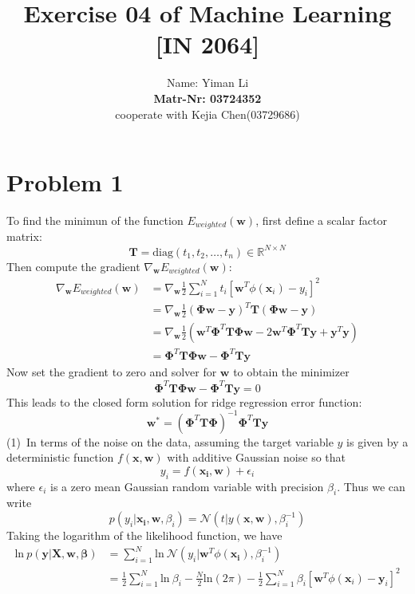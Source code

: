 \documentclass{article}
\title{Exercise 04 of Machine Learning [IN 2064]}
\author{
  Name: Yiman Li \\
  \textbf{Matr-Nr: 03724352} \\
  cooperate with Kejia Chen(03729686)\\
}
\begin{document}
\maketitle

\section*{Problem 1}
To find the minimun of the function $E_{weighted}(\bm{w})$, first define a scalar factor matrix:
\[\bm{T}=\mathrm{diag}(t_1, t_2,\dots, t_n) \in \mathbb{R}^{N\times N} \]
Then compute the gradient $\nabla_{\bm{w}}E_{weighted}(\bm{w})$:
\begin{equation}
	\begin{aligned}
	\nabla_{\bm{w}}E_{weighted}(\bm{w}) 
	&= \nabla_{\bm{w}} \frac{1}{2}\sum_{i=1}^{N}t_i[\bm{w}^T\phi(\bm{x}_i)-y_i]^2\\
	&= \nabla_{\bm{w}} \frac{1}{2}(\bm{\Phi w} - \bm{y})^T \bm{T} (\bm{\Phi w} - \bm{y})\\
	&= \nabla_{\bm{w}} \frac{1}{2}(\bm{w}^T\bm{\Phi}^T\bm{T\Phi w} - 2\bm{w}^T\bm{\Phi}^T\bm{Ty} +\bm{y}^T\bm{y})\\
	&= \bm{\Phi}^T\bm{T\Phi w}-\bm{\Phi}^T\bm{Ty}
	\end{aligned}
\end{equation}
Now set the gradient to zero and solver for $\bm{w}$ to obtain the minimizer
\begin{equation}
\bm{\Phi}^T\bm{T\Phi w}-\bm{\Phi}^T\bm{Ty} = 0
\end{equation}
This leads to the closed form solution for ridge regression error function:
\begin{equation}
\bm{w}^* = (\bm{\Phi}^T\bm{T\Phi})^{-1}\bm{\Phi}^T\bm{Ty}
\end{equation}
(1)\ In terms of the noise on the data, assuming the target variable $y$ is given by a deterministic function $f(\bm{x}, \bm{w})$ with additive Gaussian noise so that
\begin{equation}
y_i = f(\bm{x_i}, \bm{w}) +\epsilon_i
\end{equation}
where $\epsilon_i$ is a zero mean Gaussian random variable with precision $\beta_i$. Thus we can write
\begin{equation}
p(y_i|\bm{x_i}, \bm{w}, \beta_i) = \mathcal{N}(t|y(\bm{x}, \bm{w}), \beta_i^{-1})
\end{equation}
Taking the logarithm of the likelihood function, we have
\begin{equation}
\begin{aligned}
\mathrm{ln}\ p(\bm{y}|\bm{X}, \bm{w}, \bm{\beta}) 
&= \sum_{i=1}^{N} \mathrm{ln}\ \mathcal{N}(y_i|\bm{w}^T\phi(\bm{x_i}), \beta_i^{-1})\\
&= \frac{1}{2}\sum_{i=1}^{N}\mathrm{ln}\ \beta_i - \frac{N}{2} \mathrm{ln}(2\pi) - \frac{1}{2}\sum_{i=1}^{N}\beta_i[\bm{w}^T\phi(\bm{x}_i) - \bm{y}_i]^2
\label{multivariate Gaussian logarithm}
\end{aligned}
\end{equation}
\end{document}
